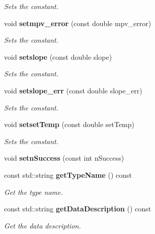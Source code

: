 \begin{DoxyCompactItemize}
\begin{DoxyCompactList}\small\item\em Sets the constant. \end{DoxyCompactList}\item 
void {\bf setmpv\-\_\-error} (const double mpv\-\_\-error)\label{classCALICE_1_1ScECALMIPfit_a3ee1e7a68474f8de89b975b67038c513}

\begin{DoxyCompactList}\small\item\em Sets the constant. \end{DoxyCompactList}\item 
void {\bf setslope} (const double slope)\label{classCALICE_1_1ScECALMIPfit_a4bf2f2f183ce8021bd48dc37968bd95a}

\begin{DoxyCompactList}\small\item\em Sets the constant. \end{DoxyCompactList}\item 
void {\bf setslope\-\_\-err} (const double slope\-\_\-err)\label{classCALICE_1_1ScECALMIPfit_aecdb9b8aea46b4bd13151fa5ae49884f}

\begin{DoxyCompactList}\small\item\em Sets the constant. \end{DoxyCompactList}\item 
void {\bf setset\-Temp} (const double set\-Temp)\label{classCALICE_1_1ScECALMIPfit_ac73a4be0593d464fb7a2778b403f29d0}

\begin{DoxyCompactList}\small\item\em Sets the constant. \end{DoxyCompactList}\item 
void {\bfseries setn\-Success} (const int n\-Success)\label{classCALICE_1_1ScECALMIPfit_a76a07cc7097784181a189c24611287cf}

\item 
const std\-::string {\bf get\-Type\-Name} () const 
\begin{DoxyCompactList}\small\item\em Get the type name. \end{DoxyCompactList}\item 
const std\-::string {\bf get\-Data\-Description} () const 
\begin{DoxyCompactList}\small\item\em Get the data description. \end{DoxyCompactList}\end{DoxyCompactItemize}


